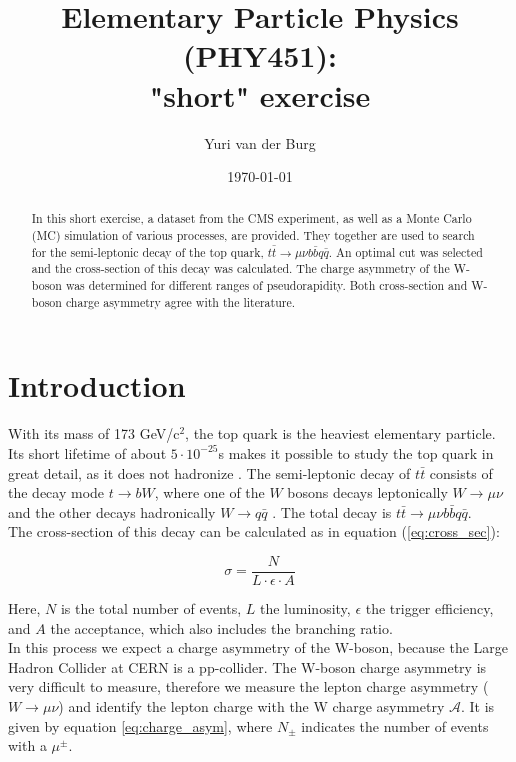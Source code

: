 \documentclass[%
 reprint,
 amsmath,amssymb,
 aps,
]{revtex4-2}
\begin{document}

\title{Elementary Particle Physics (PHY451): \\ "short" exercise}

\author{Yuri van der Burg}

\date{\today}

\begin{abstract}
In this short exercise, a dataset from the CMS experiment, as well as a Monte Carlo (MC) simulation of various processes, are provided. They together are used to search for the semi-leptonic decay of the top quark, $t \bar t \rightarrow \mu \nu b \bar b q \bar q$. An optimal cut was selected and the cross-section of this decay was calculated. The charge asymmetry of the W-boson was determined for different ranges of pseudorapidity. Both cross-section and W-boson charge asymmetry agree with the literature. 
\end{abstract}
\maketitle


\section{\label{sec:introduction}Introduction}
With its mass of 173 GeV/c$^2$, the top quark is the heaviest elementary particle. Its short lifetime of about $5 \cdot 10^{-25}$s makes it possible to study the top quark in great detail, as it does not hadronize \cite{workman_review_2022}.
The semi-leptonic decay of $t \bar t$ consists of the decay mode $t \rightarrow bW$, where one of the $W$ bosons decays leptonically $W \rightarrow \mu \nu$ and the other decays hadronically $W \rightarrow q \bar q$ \cite{cms_collaboration_measurement_2018}. The total decay is $t \bar t \rightarrow \mu \nu b \bar b q \bar q$. \\
The cross-section of this decay can be calculated as in equation (\ref{eq:cross_sec}):

\begin{equation}\label{eq:cross_sec}
    \sigma = \frac{N}{L \cdot \epsilon \cdot A}
\end{equation}

Here, $N$ is the total number of events, $L$ the luminosity, $\epsilon$ the trigger efficiency, and $A$ the acceptance, which also includes the branching ratio.\\
In this process we expect a charge asymmetry of the W-boson, because the Large Hadron Collider at CERN is a pp-collider. The W-boson charge asymmetry is very difficult to measure, therefore we measure the lepton charge asymmetry ($W \rightarrow \mu \nu$) and identify the lepton charge with the W charge asymmetry $\mathcal{A}$. It is given by equation \ref{eq:charge_asym}, where $N_{\pm}$ indicates the number of events with a $\mu^{\pm}$. 
\end{document}
